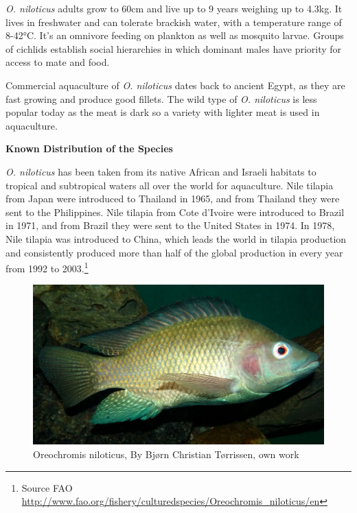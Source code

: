 \documentclass[]{book}
\theoremstyle{definition}
\theoremstyle{definition}
\theoremstyle{definition}
\theoremstyle{remark}
\begin{document}
\emph{O. niloticus} adults grow to 60cm and live up to 9 years weighing
up to 4.3kg. It lives in freshwater and can tolerate brackish water,
with a temperature range of 8-42°C. It's an omnivore feeding on plankton
as well as mosquito larvae. Groups of cichlids establish social
hierarchies in which dominant males have priority for access to mate and
food.

Commercial aquaculture of \emph{O. niloticus} dates back to ancient
Egypt, as they are fast growing and produce good fillets. The wild type
of \emph{O. niloticus} is less popular today as the meat is dark so a
variety with lighter meat is used in aquaculture.

\textbf{Known Distribution of the Species}

\emph{O. niloticus} has been taken from its native African and Israeli
habitats to tropical and subtropical waters all over the world for
aquaculture. Nile tilapia from Japan were introduced to Thailand in
1965, and from Thailand they were sent to the Philippines. Nile tilapia
from Cote d'Ivoire were introduced to Brazil in 1971, and from Brazil
they were sent to the United States in 1974. In 1978, Nile tilapia was
introduced to China, which leads the world in tilapia production and
consistently produced more than half of the global production in every
year from 1992 to 2003.\footnote{Source FAO
  \url{http://www.fao.org/fishery/culturedspecies/Oreochromis_niloticus/en}}

\begin{figure}

{\centering \includegraphics[width=44.56in]{images_species/Oreochromis-niloticus-Nairobi} 

}

\caption{Oreochromis niloticus, By Bjørn Christian Tørrissen, own work}\label{fig:unnamed-chunk-7}
\end{figure}
\end{document}
